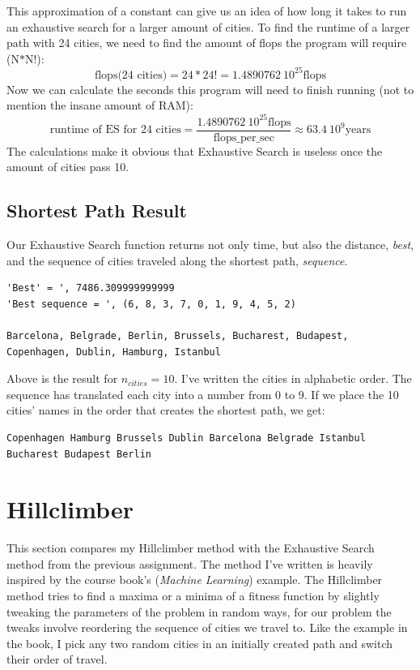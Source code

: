 \documentclass[10pt, a4paper]{article}
\begin{document}
This approximation of a constant can give us an idea of how long it takes to run an exhaustive search for a larger amount of cities.
To find the runtime of a larger path with 24 cities, we need to find the amount of flops the program will require (N$*$N!):
$$\text{flops(24 cities)} = 24*24! = 1.4890762\ 10^{25} \text{flops}$$
Now we can calculate the seconds this program will need to finish running (not to mention the insane amount of RAM):
$$\text{runtime of ES for 24 cities} = \frac{1.4890762\ 10^{25} \text{flops}}{\text{flops\_per\_sec}} \approx 63.4\ 10^{9} \text{years} $$
The calculations make it obvious that Exhaustive Search is useless once the amount of cities pass 10.
\subsection{Shortest Path Result}

Our Exhaustive Search function returns not only time, but also the distance, \emph{best}, and the sequence of cities traveled along the shortest path, \emph{sequence}.
\begin{lstlisting}
'Best' = ', 7486.309999999999
'Best sequence = ', (6, 8, 3, 7, 0, 1, 9, 4, 5, 2)

Barcelona, Belgrade, Berlin, Brussels, Bucharest, Budapest, Copenhagen, Dublin, Hamburg, Istanbul
\end{lstlisting}
Above is the result for $n_{cities} = 10$. I've written the cities in alphabetic order. The sequence has translated each city into a number from 0 to 9. 
If we place the 10 cities' names in the order that creates the shortest path, we get: 
\begin{lstlisting}
Copenhagen Hamburg Brussels Dublin Barcelona Belgrade Istanbul Bucharest Budapest Berlin 
\end{lstlisting}
\clearpage
\section{Hillclimber}
This section compares my Hillclimber method with the Exhaustive Search method from the previous assignment. The method I've written is heavily inspired by the course book's (\emph{Machine Learning}) example.
The Hillclimber method tries to find a maxima or a minima of a fitness function by slightly tweaking the parameters of the problem in random ways, for our problem the tweaks involve reordering the sequence of cities we travel to.
Like the example in the book, I pick any two random cities in an initially created path and switch their order of travel.
\end{document}
